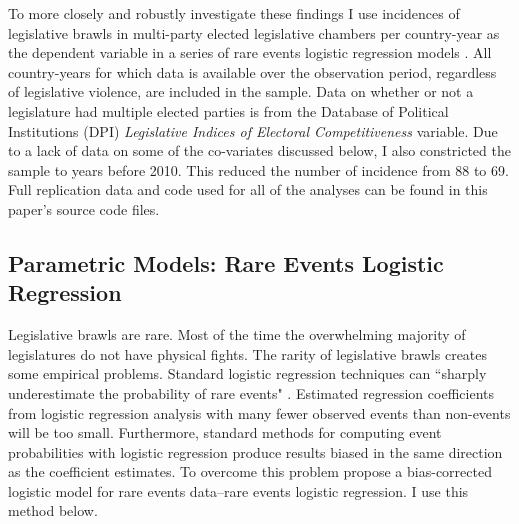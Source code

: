 \documentclass[a4paper]{article}\usepackage[]{graphicx}\usepackage[]{color}
\begin{document}
To more closely and robustly investigate these findings I use incidences of legislative brawls in multi-party elected legislative chambers per country-year as the dependent variable in a series of rare events logistic regression models \citep{KingRareEvents2001, KingRareEventsPA2001}. All country-years for which data is available over the observation period, regardless of legislative violence, are included in the sample. Data on whether or not a legislature had multiple elected parties is from the Database of Political Institutions (DPI) \citep[updated to 2010]{DPI2001} {\emph{Legislative Indices of Electoral Competitiveness}} variable. Due to a lack of data on some of the co-variates discussed below, I also constricted the sample to years before 2010. This reduced the number of incidence from 88 to 69. Full replication data and code used for all of the analyses can be found in this paper's source code files.

\subsection{Parametric Models: Rare Events Logistic Regression}

Legislative brawls are rare. Most of the time the overwhelming majority of legislatures do not have physical fights. The rarity of legislative brawls creates some empirical problems. Standard logistic regression techniques can ``sharply underestimate the probability of rare events" \cite[137]{KingRareEventsPA2001}. Estimated regression coefficients from logistic regression analysis with many fewer observed events than non-events will be too small. Furthermore, standard methods for computing event probabilities with logistic regression produce results biased in the same direction as the coefficient estimates. To overcome this problem \cite{KingRareEvents2001,KingRareEventsPA2001} propose a bias-corrected logistic model for rare events data--rare events logistic regression. I use this method below.
\end{document}
